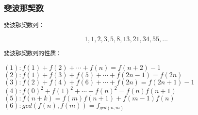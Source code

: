 \subsubsection{斐波那契数}
\begin{verbatim}
斐波那契数列：
\end{verbatim}
$$1,1,2,3,5,8,13,21,34,55,\ldots$$

\begin{verbatim}
斐波那契数列的性质：
\end{verbatim}
$(1):f(1)+f(2)+\cdots+f(n)=f(n+2)-1$ \newline
$(2):f(1)+f(3)+f(5)+\cdots+f(2n-1)=f(2n)$ \newline
$(3):f(2)+f(4)+f(6)+\cdots+f(2n)=f(2n+1)-1$ \newline
$(4):f(0)^2+f(1)^2+\cdots+f(n)^2=f(n)f(n+1)$ \newline
$(5):f(n+k)=f(m)f(n+1)+f(m-1)f(n)$ \newline
$(6):gcd(f(n),f(m))=f_{gcd(n,m)}$ \newline
